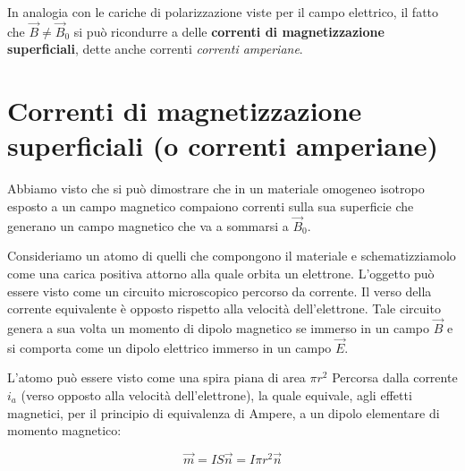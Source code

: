 In analogia con le cariche di polarizzazione viste per il campo elettrico, il fatto che $ \vec{B} \neq \vec{B}_0  $ si può ricondurre a delle \textbf{correnti di magnetizzazione superficiali}, dette anche correnti \emph{correnti amperiane}.

\section{Correnti di magnetizzazione superficiali (o correnti amperiane)}

Abbiamo visto che si può dimostrare che in un materiale omogeneo isotropo esposto a un campo magnetico compaiono correnti sulla sua superficie che generano un campo magnetico che va a sommarsi a $ \vec{B}_0  $.

Consideriamo un atomo di quelli che compongono il materiale e schematizziamolo come una carica positiva attorno alla quale orbita un elettrone. L'oggetto può essere visto come un circuito microscopico percorso da corrente. Il verso della corrente equivalente è opposto rispetto alla velocità dell'elettrone. Tale circuito genera a sua volta un momento di dipolo magnetico se immerso in un campo $\vec{B}$ e si comporta come un dipolo elettrico immerso in un campo $\vec{E}$.

L'atomo può essere visto come una spira piana di area $ \pi r^2  $
Percorsa dalla corrente $ i_a  $ (verso opposto alla velocità dell'elettrone), la quale equivale, agli effetti magnetici, per il principio di equivalenza di Ampere, a un dipolo elementare di momento magnetico:

\[
	\vec{m} =IS\vec{n} = I\pi r^2 \vec{n}
\]

